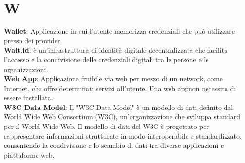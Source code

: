 \section*{W}
\textbf{Wallet}: Applicazione in cui l'utente memorizza credenziali che può utilizzare presso dei provider.\\ %
\textbf{Walt.id}: è un'infrastruttura di identità digitale decentralizzata che facilita l'accesso e la condivisione delle credenziali digitali tra le persone e le organizzazioni.\\
\textbf{Web App}: Applicazione fruibile via web per mezzo di un network, come Internet, che offre determinati servizi all'utente. Una web app\glo non necessita di essere installata.\\
\textbf{W3C Data Model}: Il "W3C Data Model" è un modello di dati definito dal World Wide Web Consortium (W3C), un'organizzazione che sviluppa standard per il World Wide Web. Il modello di dati del W3C è progettato per rappresentare informazioni strutturate in modo interoperabile e standardizzato, consentendo la condivisione e lo scambio di dati tra diverse applicazioni e piattaforme web.\\